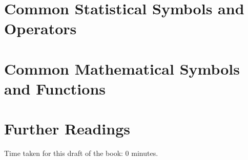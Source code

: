 \documentclass[
]{book}
\begin{document}
\hypertarget{S:NC:StatSymbols}{%
\section{Common Statistical Symbols and Operators}\label{S:NC:StatSymbols}}

\hypertarget{S:NC:Symbols}{%
\section{Common Mathematical Symbols and Functions}\label{S:NC:Symbols}}

\hypertarget{further-readings}{%
\section{Further Readings}\label{further-readings}}

Time taken for this draft of the book: 0 minutes.

  
\end{document}
